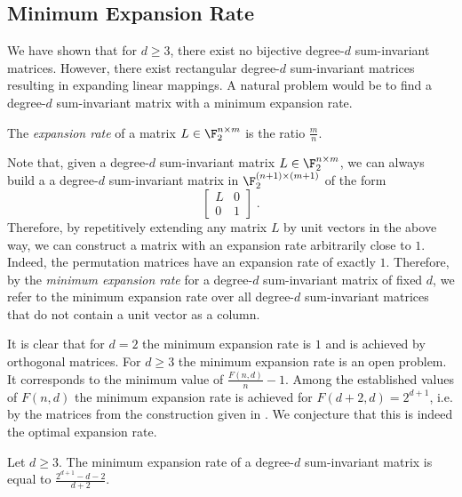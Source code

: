 
\subsection{Minimum Expansion Rate}
We have shown that for $d \ge 3$, there exist no bijective degree-$d$ sum-invariant matrices. However, there exist rectangular degree-$d$ sum-invariant matrices resulting in expanding linear mappings. 
A natural problem would be to find a degree-$d$ sum-invariant matrix with a minimum expansion rate.



\begin{definition}
The \emph{expansion rate} of a matrix $L \in \F_2^{n\times m}$ is the ratio $\frac{m}{n}$.
\end{definition}

Note that, given a degree-$d$ sum-invariant matrix $L \in \F_2^{n \times m}$, we can always build a a degree-$d$ sum-invariant matrix in $\F_2^{(n+1)\times(m+1)}$ of the form
\[ \left[\begin{array}{cc} L & 0 \\
0 & 1\end{array}\right]\;.\]
Therefore, by repetitively extending any matrix $L$ by unit vectors in the above way, we can construct a matrix with an expansion rate arbitrarily close to $1$. Indeed, the permutation matrices have an expansion rate of exactly $1$. Therefore, by the \emph{minimum expansion rate} for a degree-$d$ sum-invariant matrix of fixed $d$, we refer to the minimum expansion rate over all degree-$d$ sum-invariant matrices that do not contain a unit vector as a column.

It is clear that for $d=2$ the minimum expansion rate is $1$ and is achieved by orthogonal matrices. For $d \ge 3$ the minimum expansion rate is an open problem. It corresponds to the minimum value of $\frac{F(n,d)}{n}-1$. Among the established values of $F(n,d)$ the minimum expansion rate is achieved for $F(d+2,d)=2^{d+1}$, i.e. by the matrices from the construction given in . We conjecture that this is indeed the optimal expansion rate.

\begin{conjecture}
Let $d \ge 3$. The minimum expansion rate of a degree-$d$ sum-invariant matrix is equal to $\frac{2^{d+1}-d-2}{d+2}$.
\end{conjecture}


